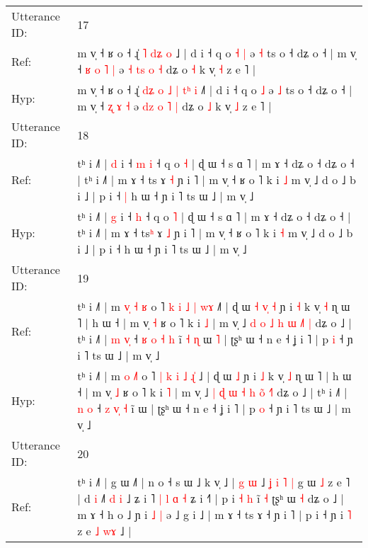 \documentclass[10pt]{article}
\DeclareRobustCommand{\hl}[1]{{\textcolor{red}{#1}}}
\begin{document}
\begin{longtable}{ll}
 \\
\midrule
Utterance ID: & 17 \\
Ref: & m v̩ ˧ ʁ o ˧ ɻ̍\hl{}\hl{}\hl{}\hl{}\hl{}\hl{}\hl{} \hl{˥} \hl{d}\hl{ʑ} \hl{o} ˩\hl{} | d i ˧ q o\hl{ }\hl{˧} \hl{|} ə \hl{˧} ts o ˧ dʑ o ˧ | m v̩ ˧\hl{ }\hl{ʁ} \hl{o} \hl{˥} \hl{|} ə \hl{˧}\hl{ }\hl{t}\hl{s} \hl{o} \hl{˧} dʑ o \hl{˧} k v̩ \hl{˧} z e ˥ |
 \\
Hyp: & m v̩ ˧ ʁ o ˧ ɻ̍\hl{ }\hl{d}\hl{ʑ}\hl{ }\hl{o}\hl{ }\hl{˩} \hl{|} \hl{t}\hl{ʰ} \hl{i} ˩\hl{˥} | d i ˧ q o\hl{}\hl{} \hl{˩} ə \hl{˩} ts o ˧ dʑ o ˧ | m v̩ ˧\hl{}\hl{} \hl{ʐ} \hl{ɤ} \hl{˧} ə \hl{d}\hl{z}\hl{ }\hl{o} \hl{˥} \hl{|} dʑ o \hl{˩} k v̩ \hl{˩} z e ˥ |
 \\
\midrule
Utterance ID: & 18 \\
Ref: & tʰ i ˩˥ | \hl{d} i ˧\hl{ }\hl{m} \hl{i} ˧ q o \hl{˧} | ɖ ɯ ˧ s ɑ ˥ | m ɤ ˧ dʑ o ˧ dʑ o ˧ | tʰ i ˩˥ | m ɤ ˧ ts\hl{} ɤ \hl{˧} ɲ i ˥ | m v̩ ˧ ʁ o ˥ k i \hl{˩} m v̩ ˩ d o ˩ b i ˩ | p i ˧\hl{ }\hl{|} h ɯ ˧ ɲ i ˥ ts ɯ ˩ | m v̩ ˩
 \\
Hyp: & tʰ i ˩˥ | \hl{g} i ˧\hl{}\hl{} \hl{h} ˧ q o \hl{˥} | ɖ ɯ ˧ s ɑ ˥ | m ɤ ˧ dʑ o ˧ dʑ o ˧ | tʰ i ˩˥ | m ɤ ˧ ts\hl{ʰ} ɤ \hl{˩} ɲ i ˥ | m v̩ ˧ ʁ o ˥ k i \hl{˧} m v̩ ˩ d o ˩ b i ˩ | p i ˧\hl{}\hl{} h ɯ ˧ ɲ i ˥ ts ɯ ˩ | m v̩ ˩
 \\
\midrule
Utterance ID: & 19 \\
Ref: & tʰ i ˩˥ | m \hl{v}\hl{̩} \hl{˧}\hl{ }\hl{ʁ} o ˥ \hl{k} \hl{i} \hl{˩} \hl{|} \hl{w}\hl{ɤ} ˩\hl{˥} | ɖ ɯ\hl{ }\hl{˧}\hl{ }\hl{v}\hl{̩} \hl{˧} ɲ i \hl{˧} k v̩ \hl{˧} ɳ ɯ ˥ | h ɯ ˧ | m v̩ \hl{˧} ʁ o ˥ k i \hl{˩} | m v̩ ˩ \hl{d} \hl{o} \hl{˩} \hl{h} \hl{ɯ} \hl{˩}\hl{˥} \hl{}\hl{|} dʑ o ˩ | tʰ i ˩˥ | \hl{m} \hl{v}\hl{̩} ˧ \hl{ʁ} \hl{o}\hl{ }\hl{˧} \hl{h} ĩ\hl{ }\hl{˧}\hl{ }\hl{ɳ} ɯ\hl{ }\hl{˥} | ʈʂʰ ɯ ˧ n e ˧ ʝ i ˥ | p \hl{i} ˧ ɲ i ˥ ts ɯ ˩ | m v̩ ˩
 \\
Hyp: & tʰ i ˩˥ | m \hl{}\hl{o} \hl{}\hl{˩}\hl{˥} o ˥ \hl{|} \hl{k} \hl{i} \hl{˩} \hl{ɻ}\hl{̍} ˩\hl{} | ɖ ɯ\hl{}\hl{}\hl{}\hl{}\hl{} \hl{˩} ɲ i \hl{˩} k v̩ \hl{˩} ɳ ɯ ˥ | h ɯ ˧ | m v̩ \hl{˩} ʁ o ˥ k i \hl{˥} | m v̩ ˩ \hl{|} \hl{ɖ} \hl{ɯ} \hl{˧} \hl{h} \hl{o}\hl{̃} \hl{˧}\hl{˥} dʑ o ˩ | tʰ i ˩˥ | \hl{n} \hl{}\hl{o} ˧ \hl{z} \hl{}\hl{v}\hl{̩} \hl{˧} ĩ\hl{}\hl{}\hl{}\hl{} ɯ\hl{}\hl{} | ʈʂʰ ɯ ˧ n e ˧ ʝ i ˥ | p \hl{o} ˧ ɲ i ˥ ts ɯ ˩ | m v̩ ˩
 \\
\midrule
Utterance ID: & 20 \\
Ref: & tʰ i ˩˥ | g ɯ ˩˥ | n o ˧ s ɯ ˩ k v̩ ˩ | \hl{g} \hl{ɯ} ˩\hl{ }\hl{ʝ} \hl{i} \hl{˥} \hl{|} g ɯ \hl{˩} z e \hl{}˥ | d \hl{i} ˩˥\hl{}\hl{} \hl{d} \hl{i} ˩ ʑ i ˥ \hl{|} \hl{l} \hl{ɑ} \hl{˧} ʑ i ˧\hl{˥} | p i\hl{ }\hl{˧} \hl{h} ĩ\hl{ }\hl{˧} ʈʂʰ ɯ \hl{˧} dʑ o ˩ | m ɤ ˧ h o ˩ ɲ i\hl{ }\hl{˩} \hl{|} ə ˩ g i ˩ | m ɤ ˧ ts ɤ ˧ ɲ i ˥ | p i ˧ ɲ i \hl{˥} z e\hl{ }\hl{˩}\hl{ }\hl{w}\hl{ɤ} ˩ |

\end{longtable}
\end{document}
